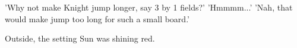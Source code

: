 \noindent
'Why not make Knight jump longer, say 3 by 1 fields?' \newline
'Hmmmm...' \newline
'Nah, that would make jump too long for such a small board.'

Outside, the setting Sun was shining red.

\vspace*{1.1\baselineskip}
\begin{flushright}
\parbox{0.6\textwidth}{
\emph{ \hspace*{\fill}{late November, 1975} \newline
\hspace*{\fill}{Bednja, Croatia} } }
\end{flushright}

\clearpage %
